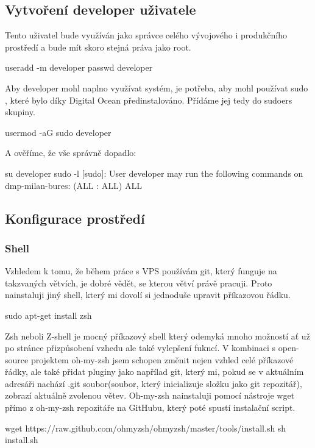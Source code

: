 \documentclass[12pt,a4paper]{report}
\begin{document}
  \subsection{Vytvoření developer uživatele}
  Tento uživatel bude využíván jako správce celého vývojového i produkčního prostředí a bude mít skoro stejná
  práva jako root. \\
  \begin{bash}
    useradd -m developer
    passwd developer
  \end{bash}
  Aby developer mohl naplno využívat systém, je potřeba, aby mohl používat sudo , které bylo díky
  Digital Ocean předinstalováno. Přídáme jej tedy do sudoers skupiny.\\
  \begin{bash}
    usermod -aG sudo developer
  \end{bash}
  A ověříme, že vše správně dopadlo:\\
  \begin{bash}
   su developer
   sudo -l
   [sudo]:
   User developer may run the following commands on dmp-milan-bures:
   (ALL : ALL) ALL
  \end{bash}


  \subsection{Konfigurace prostředí}
  \subsubsection{Shell}
  Vzhledem k tomu, že během práce s VPS používám git, který funguje na takzvaných větvích, je dobré vědět, se kterou větví právě pracuji.
  Proto nainstaluji jiný shell, který mi dovolí si jednoduše upravit příkazovou řádku.
  \begin{bash}
    sudo apt-get install zsh
  \end{bash}
  Zsh neboli Z-shell je mocný příkazový shell který odemyká mnoho možností ať už po stránce přizpůsobení vzhedu ale také vylepšení fukncí.
  V kombinaci s open-source projektem oh-my-zsh jsem schopen změnit nejen vzhled celé příkazové řádky, ale také přidat pluginy jako napřílad git, který mi, pokud se v aktuálním adresáři nachází .git soubor(soubor, který inicializuje složku jako git repozitář), zobrazí aktuálně zvolenou větev. Oh-my-zsh nainstaluji pomocí nástroje wget přímo z oh-my-zsh repozitáře na GitHubu, který poté spustí instalační script.
  
  \begin{bash}
    wget https://raw.github.com/ohmyzsh/ohmyzsh/master/tools/install.sh
    sh install.sh
  \end{bash}
\end{document}
